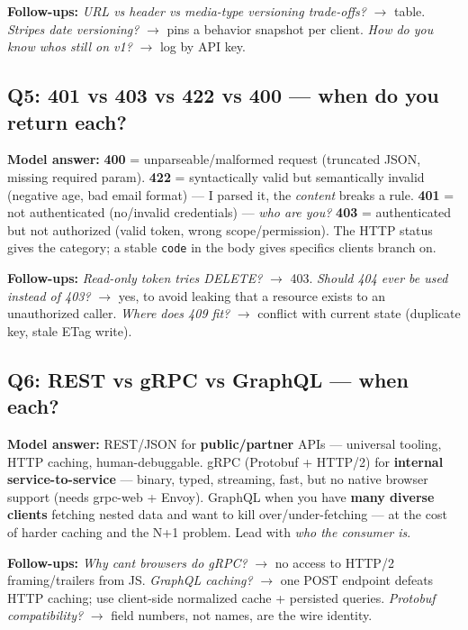 \documentclass[11pt]{article}
\begin{document}
\textbf{Follow-ups:} \emph{URL vs header vs media-type versioning trade-offs?} \(\rightarrow\) table. \emph{Stripe\textquotesingle s date versioning?} \(\rightarrow\) pins a behavior snapshot per client. \emph{How do you know who\textquotesingle s still on v1?} \(\rightarrow\) log by API key.

\subsection{Q5: 401 vs 403 vs 422 vs 400 --- when do you return each?}\label{q5-401-vs-403-vs-422-vs-400--when-do-you-return-each}

\textbf{Model answer:} \textbf{400} = unparseable/malformed request (truncated JSON, missing required param). \textbf{422} = syntactically valid but semantically invalid (negative age, bad email format) --- I parsed it, the \emph{content} breaks a rule. \textbf{401} = not authenticated (no/invalid credentials) --- \emph{who are you?} \textbf{403} = authenticated but not authorized (valid token, wrong scope/permission). The HTTP status gives the category; a stable \texttt{code} in the body gives specifics clients branch on.

\textbf{Follow-ups:} \emph{Read-only token tries DELETE?} \(\rightarrow\) 403. \emph{Should 404 ever be used instead of 403?} \(\rightarrow\) yes, to avoid leaking that a resource exists to an unauthorized caller. \emph{Where does 409 fit?} \(\rightarrow\) conflict with current state (duplicate key, stale ETag write).

\subsection{Q6: REST vs gRPC vs GraphQL --- when each?}\label{q6-rest-vs-grpc-vs-graphql--when-each}

\textbf{Model answer:} REST/JSON for \textbf{public/partner} APIs --- universal tooling, HTTP caching, human-debuggable. gRPC (Protobuf + HTTP/2) for \textbf{internal service-to-service} --- binary, typed, streaming, fast, but no native browser support (needs grpc-web + Envoy). GraphQL when you have \textbf{many diverse clients} fetching nested data and want to kill over/under-fetching --- at the cost of harder caching and the N+1 problem. Lead with \emph{who the consumer is}.

\textbf{Follow-ups:} \emph{Why can\textquotesingle t browsers do gRPC?} \(\rightarrow\) no access to HTTP/2 framing/trailers from JS. \emph{GraphQL caching?} \(\rightarrow\) one POST endpoint defeats HTTP caching; use client-side normalized cache + persisted queries. \emph{Protobuf compatibility?} \(\rightarrow\) field numbers, not names, are the wire identity.
\end{document}
